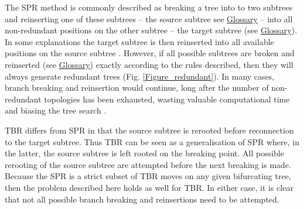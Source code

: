 \documentclass[12pt,letterpaper]{article}
\renewcommand{\section}[1]{%
\bigskip
\begin{center}
\begin{Large}
\normalfont\scshape #1
\medskip
\end{Large}
\end{center}}
\begin{document}
The SPR method is commonly described as breaking a tree into to two subtrees and reinserting one of these subtrees -- the source subtree see \hyperref[Glossary]{Glossary}%
-- into all non-redundant positions on the other subtree -- the target subtree (see \hyperref[Glossary]{Glossary}).
In some explanations the target subtree is then reinserted into all available positions on the source subtree \citep[e.g.][Fig. 8.5]{swofford2003phylogeny}.
However, if all possible subtrees are broken and reinserted (see \hyperref[Glossary]{Glossary}) %
 exactly according to the rules described, then they will always generate redundant trees (Fig. \ref{Figure_redundant}). 
In many cases, branch breaking and reinsertion would continue, long after the number of non-redundant topologies has been exhausted, wasting valuable computational time and biasing the tree search \citep{goloboff2014bias}.

TBR differs from SPR in that the source subtree is rerooted before reconnection to the target subtree.
Thus TBR can be seen as a generalisation of SPR where, in the latter, the source subtree is left rooted on the breaking point.
All possible rerooting of the source subtree are attempted before the next breaking is made.
Because the SPR is a strict subset of TBR moves on any given bifurcating tree, then the problem described here holds as well for TBR.
In either case, it is clear that not all possible branch breaking and reinsertions need to be attempted.

\end{document}

